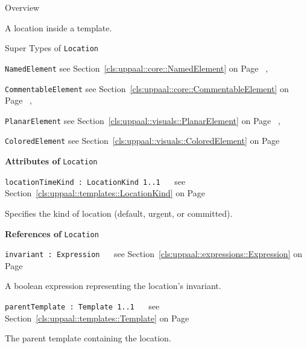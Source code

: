 	\begin{longdescription}
		\item[Overview] 		
				

	

		A location inside a template.		
		\item[Super Types of \texttt{Location}] ~
			\begin{longdescription}
				\item[\texttt{NamedElement}] see Section~\ref{cls:uppaal::core::NamedElement} on Page~\pageref{cls:uppaal::core::NamedElement}			, 				\item[\texttt{CommentableElement}] see Section~\ref{cls:uppaal::core::CommentableElement} on Page~\pageref{cls:uppaal::core::CommentableElement}			, 				\item[\texttt{PlanarElement}] see Section~\ref{cls:uppaal::visuals::PlanarElement} on Page~\pageref{cls:uppaal::visuals::PlanarElement}			, 				\item[\texttt{ColoredElement}] see Section~\ref{cls:uppaal::visuals::ColoredElement} on Page~\pageref{cls:uppaal::visuals::ColoredElement}						\end{longdescription}
		
	
			\item[\textbf{Attributes of} \texttt{Location}] ~
			\begin{longdescription}
	\item[\texttt{locationTimeKind : LocationKind 	\symbol{"5B}1..1\symbol{"5D}
}] ~
	see Section~\ref{cls:uppaal::templates::LocationKind} on Page~\pageref{cls:uppaal::templates::LocationKind}
	
	\nopagebreak
		
				

	

		Specifies the kind of location (default, urgent, or committed).		
			\end{longdescription}
			\item[\textbf{References of} \texttt{Location}] ~
			\begin{longdescription}
	\item[\texttt{invariant : Expression 	}] ~
	see Section~\ref{cls:uppaal::expressions::Expression} on Page~\pageref{cls:uppaal::expressions::Expression}
	
	\nopagebreak
		
				

	

		A boolean expression representing the location's invariant.		
	\item[\texttt{parentTemplate : Template 	\symbol{"5B}1..1\symbol{"5D}
}] ~
	see Section~\ref{cls:uppaal::templates::Template} on Page~\pageref{cls:uppaal::templates::Template}
	
	\nopagebreak
		
				

	

		The parent template containing the location.		
			\end{longdescription}
	
	\end{longdescription}
	

